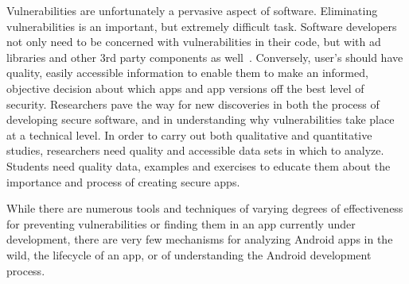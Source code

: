 \documentclass[journal,transmag]{IEEEtran}
\begin{document}
Vulnerabilities are unfortunately a pervasive aspect of software. Eliminating vulnerabilities is an important, but extremely difficult task. Software developers not only need to be concerned with vulnerabilities in their code, but with ad libraries and other 3rd party components as well~\cite{Sun:2014:NPA:2627393.2627396, 7371575, Grace:2012:UEA:2185448.2185464}.  Conversely, user's should have quality, easily accessible information to enable them to make an informed, objective decision about which apps and app versions off the best level of security. Researchers pave the way for new discoveries in both the process of developing secure software, and in understanding why vulnerabilities take place at a technical level. In order to carry out both qualitative and quantitative studies, researchers need quality and accessible data sets in which to analyze. Students need quality data, examples and exercises to educate them about the importance and process of creating secure apps.

While there are numerous tools and techniques of varying degrees of effectiveness for preventing vulnerabilities or finding them in an app currently under development, there are very few mechanisms for analyzing Android apps in the wild, the lifecycle of an app, or of understanding the Android development process.















\end{document}
